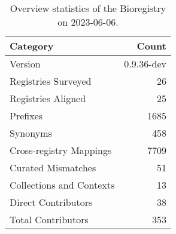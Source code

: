 \begin{table}
\caption{Overview statistics of the Bioregistry on 2023-06-06.}
\label{tab:bioregistry-summary}
\begin{tabular}{lr}
\toprule
Category & Count \\
\midrule
Version & 0.9.36-dev \\
Registries Surveyed & 26 \\
Registries Aligned & 25 \\
Prefixes & 1685 \\
Synonyms & 458 \\
Cross-registry Mappings & 7709 \\
Curated Mismatches & 51 \\
Collections and Contexts & 13 \\
Direct Contributors & 38 \\
Total Contributors & 353 \\
\bottomrule
\end{tabular}
\end{table}
